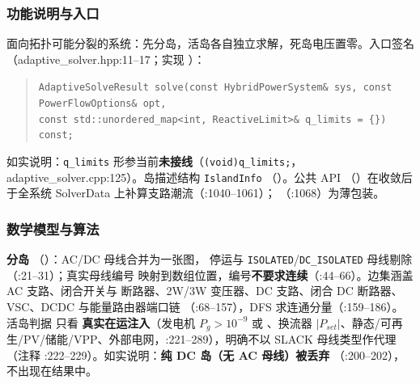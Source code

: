 \subsubsection*{功能说明与入口}
面向拓扑可能分裂的系统：先分岛，活岛各自独立求解，死岛电压置零。入口签名
（adaptive\_solver.hpp:11--17；实现 ）：
\begin{quote}\footnotesize
\texttt{AdaptiveSolveResult solve(const HybridPowerSystem\& sys, const PowerFlowOptions\& opt,\\
\hspace*{2em}const std::unordered\_map<int, ReactiveLimit>\& q\_limits = \{\}) const;}
\end{quote}
如实说明：\texttt{q\_limits} 形参当前\textbf{未接线}（\texttt{(void)q\_limits;}，
adaptive\_solver.cpp:125）。岛描述结构 \texttt{IslandInfo}
（）。公共 API
（）在收敛后
于全系统 SolverData 上补算支路潮流（:1040--1061）；
（:1068）为薄包装。

\subsubsection*{数学模型与算法}
\textbf{分岛} 
（）：AC/DC 母线合并为一张图，
停运与 \texttt{ISOLATED}/\texttt{DC\_ISOLATED} 母线剔除（:21--31）；真实母线编号
映射到数组位置，编号\textbf{不要求连续}（:44--66）。边集涵盖 AC 支路、闭合开关与
断路器、2W/3W 变压器、DC 支路、闭合 DC 断路器、VSC、DCDC 与能量路由器端口链
（:68--157），DFS 求连通分量（:159--186）。活岛判据  只看
\textbf{真实在运注入}（发电机 $P_g>10^{-9}$ 或 、换流器
$|P_{set}|$、静态/可再生/PV/储能/VPP、外部电网，:221--289），明确不以 SLACK
母线类型作代理（注释 :222--229）。如实说明：\textbf{纯 DC 岛（无 AC 母线）被丢弃}
（:200--202），不出现在结果中。

